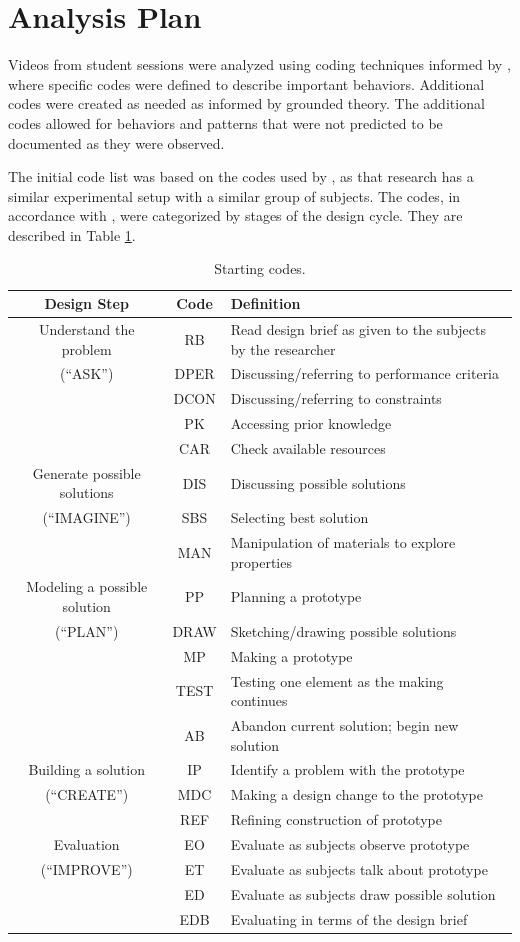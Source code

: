 \section{Analysis Plan}
Videos from student sessions were analyzed using coding techniques informed by \citet{welch}, where specific codes were defined to describe important behaviors. Additional codes were created as needed as informed by grounded theory. The additional codes allowed for behaviors and patterns that were not predicted to be documented as they were observed.

The initial code list was based on the codes used by \citet{REESE},
as that research has a similar experimental setup with a similar group
of subjects. The codes, in accordance with \citeauthor{REESE}, were categorized by stages of the design cycle. They are described in Table \ref{tab:Starting-codes}.


%
\begin{table}
\begin{centering}
\begin{tabular}{|c|c| p{3.5in} |}
\hline 
Design Step & Code & Definition\tabularnewline
\hline
Understand the problem & RB & Read design brief as given to the subjects by the researcher\tabularnewline
\cline{2-3} 
({}``ASK'') & DPER & Discussing/referring to performance criteria\tabularnewline
\cline{2-3} 
 & DCON & Discussing/referring to constraints\tabularnewline
\cline{2-3} 
 & PK & Accessing prior knowledge\tabularnewline
\cline{2-3} 
 & CAR & Check available resources\tabularnewline
\hline 
Generate possible solutions & DIS & Discussing possible solutions\tabularnewline
\cline{2-3} 
({}``IMAGINE'') & SBS & Selecting best solution\tabularnewline
\cline{2-3} 
 & MAN & Manipulation of materials to explore properties\tabularnewline
\hline
Modeling a possible solution & PP & Planning a prototype\tabularnewline
\cline{2-3} 
({}``PLAN'') & DRAW & Sketching/drawing possible solutions\tabularnewline
\cline{2-3} 
 & MP & Making a prototype\tabularnewline
\cline{2-3} 
 & TEST & Testing one element as the making continues\tabularnewline
\cline{2-3} 
 & AB & Abandon current solution; begin new solution\tabularnewline
\hline 
Building a solution & IP & Identify a problem with the prototype\tabularnewline
\cline{2-3} 
({}``CREATE'') & MDC & Making a design change to the prototype\tabularnewline
\cline{2-3} 
 & REF & Refining construction of prototype\tabularnewline
\hline 
Evaluation & EO & Evaluate as subjects observe prototype\tabularnewline
\cline{2-3} 
({}``IMPROVE'') & ET & Evaluate as subjects talk about prototype\tabularnewline
\cline{2-3} 
 & ED & Evaluate as subjects draw possible solution\tabularnewline
\cline{2-3} 
 & EDB & Evaluating in terms of the design brief\tabularnewline
\hline
\end{tabular}
\par

\end{centering} 

\caption{\label{tab:Starting-codes}Starting codes.}

\end{table}


